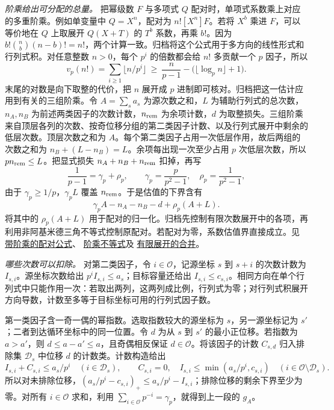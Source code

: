 \documentclass[UTF8,fontset=none,a4paper,11pt]{ctexart}
\theoremstyle{definition}
\newcommand{\src}[3]{\href{https://github.com/leanprover-community/riemann-hypothesis/blob/23aebbb302010b292314d406aa97f7901d698634/src/#1.lean\#L#2}{#3}}
\begin{document}
\emph{阶乘给出可分配的总量。}
把幂级数 \(F\) 与多项式 \(Q\) 配对时，单项式系数乘上对应的多重阶乘。例如单变量中 \(Q=X^n\)，配对为 \(n![X^n]F\)。若将 \(X^b\) 乘进 \(F\)，可以等价地在 \(Q\) 上取展开 \(Q(X+T)\) 的 \(T^b\) 系数，再乘 \(b!\)。因为 \(b!\binom nb (n-b)!=n!\)，两个计算一致。归档将这个公式用于多方向的线性形式和行列式积。对任意整数 \(n>0\)，每个 \(p^i\) 的倍数都会给 \(n!\) 多贡献一个 \(p\) 因子，所以
\[
 v_p(n!)=\sum_{i\ge1}\lfloor n/p^i\rfloor
 \ \ge\ \frac{n}{p-1}-\bigl(\lfloor\log_p n\rfloor+1\bigr).
\]
末尾的对数是向下取整的代价，把 \(n\) 展开成 \(p\) 进制即可核对。归档把这一估计应用到有关的三组阶乘。令 \(A=\sum_s a_s\) 为源次数之和，\(L\) 为辅助行列式的总次数，\(n_A,n_B\) 为前述两类因子的次数计数，\(n_{\rm rem}\) 为余项计数，\(d\) 为取整损失。三组阶乘来自顶层各列的次数、按奇位移分组的第二类因子计数、以及行列式展开中剩余的低层次数。顶层次数之和为 $A$。每个第二类因子占用一次低层作用，故后两组的次数之和为 $n_B+(L-n_B)=L$。余项每出现一次至少占用 $p$ 次低层次数，所以 $p n_{\rm rem}\le L$。把显式损失 \(n_A+n_B+n_{\rm rem}\) 扣掉，再写
\[
 \frac1{p-1}=\gamma_p+\rho_p,\qquad
 \gamma_p=\frac{p}{p^2-1},\quad \rho_p=\frac1{p^2-1},
\]
由于 \(\gamma_p\ge1/p\)，\(\gamma_p L\) 覆盖 \(n_{\rm rem}\)。于是估值的下界含有
\[
          \gamma_p A-n_A-n_B-d+\rho_p(A+L).
\]
将其中的 $\rho_p(A+L)$ 用于配对的归一化。归档先控制有限次数展开中的各项，再利用非阿基米德三角不等式控制原配对。若配对为零，系数估值界直接成立。见
\src{Formalism/ThetaLogCoordinates/UniformThetaSubstitution/StatementAB}{23}{带阶乘的配对公式}、
\src{Formalism/ThetaLogCoordinates/UniformThetaSubstitution/FrobeniusLiftNorms/ABArith}{103}{阶乘不等式}及
\src{Formalism/ThetaLogCoordinates/UniformThetaSubstitution/FrobeniusLiftNorms/NormLeOfDvd}{309}{有限展开的合并}。

\emph{哪些次数可以扣除。}
对第二类因子，令 $i\in\mathcal O$，记源坐标 $s$ 到 $s+i$ 的次数计数为 $I_{s,i}$。源坐标次数给出 $p^i I_{s,i}\le a_s$；目标容量还给出 $I_{s,i}\le c_{s,i}$。相同方向在单个行列式中只能作用一次：若取出两列，这两列成比例，行列式为零；对行列式积展开方向导数，计数至多等于目标坐标可用的行列式因子数。

第一类因子含一奇一偶的幂指数。选取指数较大的源坐标为 $s$，另一源坐标记为 $s'$；二者到达循环坐标中的同一位置。令 $d$ 为从 $s$ 到 $s'$ 的最小正位移。若指数为 $a>a'$，则 $d\le a-a'\le a$，且奇偶相反保证 $d\in\mathcal O$。将该因子的计数 $C_{s,d}$ 归入排除集 $\mathcal D_s$ 中位移 $d$ 的计数类。计数构造给出
\[
 I_{s,i}+C_{s,i}\le a_s/p^i\quad(i\in\mathcal D_s),\qquad
 C_{s,i}=0,\quad I_{s,i}\le\min(a_s/p^i,c_{s,i})\quad(i\in\mathcal O\setminus\mathcal D_s).
\]
所以对未排除位移，$(a_s/p^i-c_{s,i})_+\le a_s/p^i-I_{s,i}$；排除位移的剩余下界至少为零。对所有 $i\in\mathcal O$ 求和，利用 $\sum_{i\in\mathcal O}p^{-i}=\gamma_p$，就得到上一段的 $g_A$。
\end{document}
